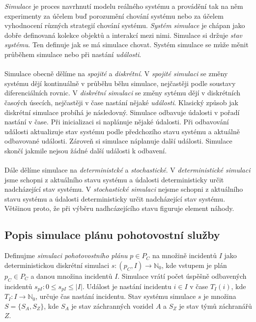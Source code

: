 \textit{Simulace} je proces navrhnutí modelu reálného systému a provádění tak na něm experimenty za účelem buď porozumění chování systému
nebo za účelem vyhodnocení různých strategií chování systému.
\textit{Systém simulace} je chápan jako dobře definovaná kolekce objektů a interakcí mezi nimi.
Simulace si držuje \textit{stav systému}. Ten definuje jak se má simulace chovat.
Systém simulace se může měnit průběhem simulace nebo při nastání \textit{události}.
\\
\\
Simulace obecně dělíme na \textit{spojité} a \textit{diskrétní}.
V \textit{spojité simulaci} se změny systému dějí kontinuálně v průběhu běhu simulace, nejčastěji podle soustavy diferenciálních rovnic.
V \textit{diskrétní simulaci} se změny sytému dějí v diskrétních časoých úsecích, nejčastěji v čase nastání nějaké \textit{události}.
Klasický způsob jak diskrétní simulace probíhá je následovný.
Simulace odbavuje údalosti v pořadí nastání v čase.
Při inicializaci si naplánuje nějaké údalosti.
Při odbavování události aktualizuje stav systému podle předchozího stavu systému a aktuálně odbavované události. Zároveň si simulace náplanuje další události. 
Simulace skončí jakmile nejsou žádné další události k odbavení.
\\
\\
Dále dělíme simulace na \textit{deterministcké} a \textit{stochastické}.
V \textit{deterministické simulaci} jsme schopni z aktuálního stavu systému a údalosti deterministicky určit nadcházející stav systému.
V \textit{stochastické simulaci} nejsme schopni z aktuálního stavu systému a údalosti deterministicky určit nadcházející stav systému.
Většinou proto, že při výběru nadhcázejícího stavu figuruje element náhody.
\cite{SimulaceBook}

\subsection{Popis simulace plánu pohotovostní služby}\label{kap:definiceSimulace}

Definujme \textit{simulaci pohotovostního plánu} $p \in P_C$ na množině incidentů $I$ jako deterministickou diskrétní simulaci
$s \colon (p_C, I) \rightarrow \mathbb{N}_0$, kde vstupem je plán $p_C \in P_C$ a danou množina incidentů $I$.
Simulace vrátí počet úspěšně odbavených incidentů $s_{pI} \colon 0 \leq s_{pI} \leq |I|$.
Událost je nastání incidentu $i \in I$ v čase $T_I(i)$, kde $T_I \colon I \rightarrow \mathbb{N}_0$, určuje čas nastání incidentu.
Stav systému simulace $s$ je množina $S = \{ S_A, S_Z \}$, kde $S_A$ je stav záchranných vozidel $A$ a $S_Z$ je stav týmů záchranářů $Z$. 


